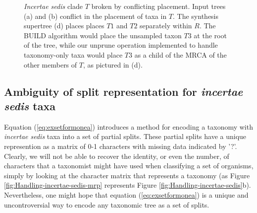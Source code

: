 \documentclass[english]{article}
\begin{document}
\begin{figure}
{}\hfill{}\hfill{}

\caption{\label{fig:Broken-incertae-sedis} \emph{Incertae sedis} clade $T$
broken by conflicting placement.
Input trees (a) and (b) conflict
in the placement of taxa in $T$.
The synthesis supertree (d) places
places $T1$ and $T2$ separately within $R$.
The BUILD algorithm would place the unsampled taxon $T3$ at the
root of the tree, while our unprune operation implemented to 
handle taxonomy-only taxa would place $T3$ as a child of the MRCA
of the other members of $T$, as pictured in (d).
}

\end{figure}

\subsection{Ambiguity of split representation for \emph{incertae sedis} taxa}
Equation (\ref{eq:exsetformonea}) introduces a method for encoding a
taxonomy with \emph{incertae sedis} taxa into a set of partial splits.
These partial splits have a unique represention as a matrix of
0-1 characters with missing data indicated by '?'.  Clearly, we will
not be able to recover the identity, or even the number, of characters
that a taxonomist might have used when classifying a set of organisms,
simply by looking at the character matrix that represents a taxonomy
(as Figure \ref{fig:Handling-incertae-sedis-mrp} represents Figure
\ref{fig:Handling-incertae-sedis}b). Nevertheless, one might hope that 
equation (\ref{eq:exsetformonea}) is a unique and uncontroversial
way to encode any taxonomic tree as a set of splits.
\end{document}
